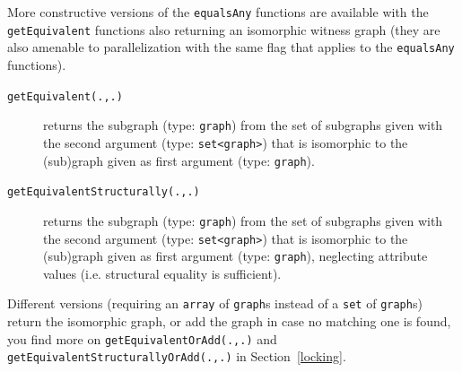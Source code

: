 More constructive versions of the \texttt{equalsAny} functions are available with the \texttt{getEquivalent} functions also returning an isomorphic witness graph (they are also amenable to parallelization with the same flag that applies to the \texttt{equalsAny} functions).
 
\begin{description}
\item[\texttt{getEquivalent(.,.)}] returns the subgraph (type: \texttt{graph}) from the set of subgraphs given with the second argument (type: \texttt{set<graph>}) that is isomorphic to the (sub)graph given as first argument (type: \texttt{graph}).
\item[\texttt{getEquivalentStructurally(.,.)}] returns the subgraph (type: \texttt{graph}) from the set of subgraphs given with the second argument (type: \texttt{set<graph>}) that is isomorphic to the (sub)graph given as first argument (type: \texttt{graph}), neglecting attribute values (i.e. structural equality is sufficient).
\end{description}

Different versions (requiring an \texttt{array} of \texttt{graph}s instead of a \texttt{set} of \texttt{graph}s) return the isomorphic graph, or add the graph in case no matching one is found, you find more on \texttt{getEquivalentOrAdd(.,.)} and \texttt{getEquivalentStructurallyOrAdd(.,.)} in Section~\ref{locking}.

